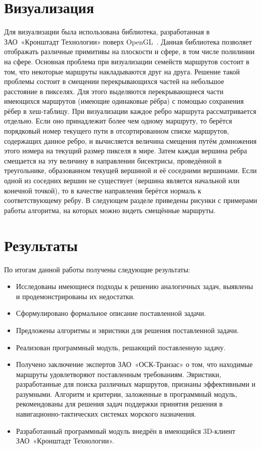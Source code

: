 \FloatBarrier

\section{Визуализация}

\label{sec:visualization-impl}

Для визуализации была использована библиотека, разработанная в
ЗАО~«Кронштадт Технологии» поверх OpenGL~\cite{opengl}. Данная
библиотека позволяет отображать различные примитивы на плоскости и
сфере, в том числе полилинии на сфере. Основная проблема при
визуализации семейств маршрутов состоит в том, что некоторые маршруты
накладываются друг на друга. Решение такой проблемы состоит в смещении
перекрывающихся частей на небольшое расстояние в пикселях. Для этого
выделяются перекрывающиеся части имеющихся маршрутов (имеющие
одинаковые рёбра) с помощью сохранения рёбер в хеш-таблицу. При
визуализации каждое ребро маршрута рассматривается отдельно. Если оно
принадлежит более чем одному маршруту, то берётся порядковый номер
текущего пути в отсортированном списке маршрутов, содержащих данное
ребро, и вычисляется величина смещения путём домножения этого номера
на текущий размер пикселя в мире. Затем каждая вершина ребра смещается
на эту величину в направлении бисектрисы, проведённой в треугольнике,
образованном текущей вершиной и её соседними вершинами. Если одной из
соседних вершин не существует (вершина является начальной или конечной
точкой), то в качестве направления берётся нормаль к соответствующему
ребру. В следующем разделе приведены рисунки с примерами работы
алгоритма, на которых можно видеть смещённые маршруты.

\FloatBarrier

\section{Результаты}

\label{sec:results}

По итогам данной работы получены следующие результаты:
\begin{itemize}
    \item Исследованы имеющиеся подходы к решению аналогичных задач,
      выявлены и продемонстрированы их недостатки.
    \item Сформулировано формальное описание поставленной задачи.
    \item Предложены алгоритмы и эвристики для решения поставленной
      задачи.
    \item Реализован программный модуль, решающий поставленную задачу.
    \item Получено заключение экспертов ЗАО~«ОСК-Транзас» о том, что
      находимые маршруты удовлетворяют поставленным требованиям.
      Эвристики, разработанные для поиска различных маршрутов,
      признаны эффективными и разумными. Алгоритм и критерии,
      заложенные в программный модуль, рекомендованы для решения задач
      поддержки принятия решения в навигационно-тактических системах
      морского назначения.
    \item Разработанный программный модуль внедрён в имеющийся
      3D-клиент ЗАО~«Кронштадт Технологии».
\end{itemize}

